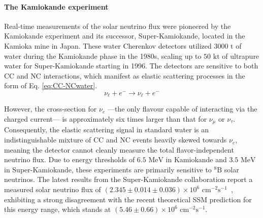 \paragraph{The Kamiokande experiment} 
Real-time measurements of the solar neutrino flux were pioneered by the Kamiokande experiment and its successor, Super-Kamiokande, located in the Kamioka mine in Japan. 
These water Cherenkov detectors utilized $3000\text{ t}$ of water during the Kamiokande phase in the 1980s, scaling up to $50\text{ kt}$ of ultrapure water for Super-Kamiokande starting in 1996. 
The detectors are sensitive to both \ac{CC} and \ac{NC} interactions, 
which manifest as elastic scattering processes in the form of Eq. \ref{eq:CC-NCwater}.
\begin{equation}
    \label{eq:CC-NCwater}
    \nu_\ell + e^- \longrightarrow \nu_\ell + e^-
\end{equation}
%         

However, the cross-section for $\nu_e$ —the only flavour capable of interacting via the charged current— is approximately six times larger than that for $\nu_\mu$ or $\nu_\tau$. 
Consequently, the elastic scattering signal in standard water is an indistinguishable mixture of \ac{CC} and \ac{NC} events heavily skewed towards $\nu_e$, meaning the detector cannot cleanly measure the total flavor-independent neutrino flux.
Due to energy thresholds of $6.5\text{ MeV}$ in Kamiokande and $3.5\text{ MeV}$ in Super-Kamiokande, these experiments are primarily sensitive to ${}^8\text{B}$ solar neutrinos. The latest results from the Super-Kamiokande collaboration report a measured solar neutrino flux of $(2.345 \pm 0.014 \pm 0.036) \times 10^{6} \text{ cm}^{-2}\text{s}^{-1}$~\cite{latestSUPERK}, exhibiting a strong disagreement with the recent theoretical \ac{SSM} prediction for this energy range, which stands at $(5.46 \pm 0.66) \times 10^{6} \text{ cm}^{-2}\text{s}^{-1}$.

